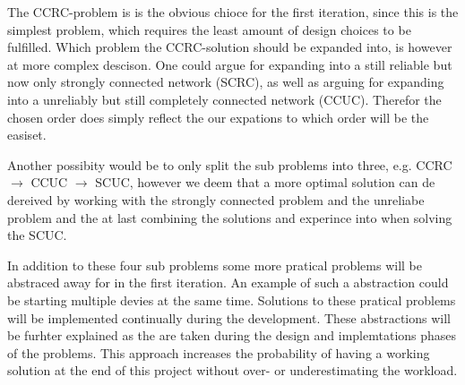\bigskip \noindent
The CCRC-problem is is the obvious chioce for the first iteration, since this is the simplest problem, which requires the least amount of design choices to be fulfilled.
Which problem the CCRC-solution should be expanded into, is however at more complex descison.
One could argue for expanding into a still reliable but now only strongly connected network (SCRC), as well as arguing for expanding into a unreliably but still completely connected network (CCUC).
Therefor the chosen order does simply reflect the our expations to which order will be the easiset.

Another possibity would be to only split the sub problems into three, e.g. CCRC $\rightarrow$ CCUC $\rightarrow$ SCUC, however we deem that a more optimal solution can de dereived by working with the strongly connected problem and the unreliabe problem and the at last combining the solutions and experince into when solving the SCUC.

In addition to these four sub problems some more pratical problems will be abstraced away for in the first iteration.
An example of such a abstraction could be starting multiple devies at the same time.
Solutions to these pratical problems will be implemented continually during the development. 
These abstractions will be furhter explained as the are taken during the design and implemtations phases of the problems.
This approach increases the probability of having a working solution at the end of this project without over- or underestimating the workload.